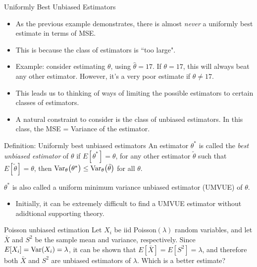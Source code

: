 \begin{frame}[allowframebreaks]{Uniformly Best Unbiased Estimators}
  \begin{itemize}
    \item As the previous example demonstrates, there is almost \emph{never} a uniformly best estimate in terms of MSE.
    \item This is because the class of estimators is ``too large".
    \item Example: consider estimating $\theta$, using $\hat{\theta} = 17$. If $\theta = 17$, this will always beat any other estimator. However, it's a very poor estimate if $\theta \neq 17$.
    \item This leads us to thinking of ways of limiting the possible estimators to certain classes of estimators.
    \item A natural constraint to consider is the class of \alert{unbiased estimators}. In this class, the MSE = Variance of the estimator.
  \end{itemize}

  \framebreak

  \begin{block}{Definition: Uniformly best unbiased estimators}
    An estimator $\theta^*$ is called the \emph{best unbiased estimator} of $\theta$ if $E[\theta^*] = \theta$, for any other estimator $\tilde{\theta}$ such that $E[\tilde{\theta}] = \theta$, then $\mathrm{Var}_\theta\big(\theta^*\big) \leq \mathrm{Var}_\theta\big(\tilde{\theta}\big)$ for all $\theta$.

    $\theta^*$ is also called a \alert{uniform minimum variance unbiased estimator} (UMVUE) of $\theta$.
  \end{block}

  \begin{itemize}
    \item Initially, it can be extremely difficult to find a UMVUE estimator without adidtional supporting theory.
  \end{itemize}

  \framebreak

  \begin{exampleblock}{Poisson unbiased estimation}
    Let $X_i$ be iid Poisson$(\lambda)$ random variables, and let $\bar{X}$ and $S^2$ be the sample mean and variance, respectively.
    Since $E[X_i] = \mathrm{Var}(X_i) = \lambda$, it can be shown that $E[\bar{X}] = E[S^2] = \lambda$, and therefore both $\bar{X}$ and $S^2$ are unbiased estimators of $\lambda$. Which is a better estimate?
  \end{exampleblock}


\end{frame}
